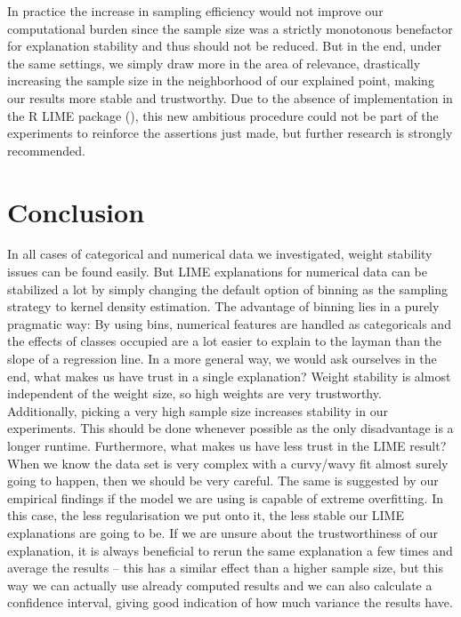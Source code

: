 \documentclass[]{krantz}
\begin{document}
In practice the increase in sampling efficiency would not improve our
computational burden since the sample size was a strictly monotonous
benefactor for explanation stability and thus should not be reduced. But
in the end, under the same settings, we simply draw more in the area of
relevance, drastically increasing the sample size in the neighborhood of
our explained point, making our results more stable and trustworthy. Due
to the absence of implementation in the R LIME package
(\citet{thomasp85lime}), this new ambitious procedure could not be part
of the experiments to reinforce the assertions just made, but further
research is strongly recommended.

\section{Conclusion}\label{conclusion-2}

In all cases of categorical and numerical data we investigated, weight
stability issues can be found easily. But LIME explanations for
numerical data can be stabilized a lot by simply changing the default
option of binning as the sampling strategy to kernel density estimation.
The advantage of binning lies in a purely pragmatic way: By using bins,
numerical features are handled as categoricals and the effects of
classes occupied are a lot easier to explain to the layman than the
slope of a regression line. In a more general way, we would ask
ourselves in the end, what makes us have trust in a single explanation?
Weight stability is almost independent of the weight size, so high
weights are very trustworthy. Additionally, picking a very high sample
size increases stability in our experiments. This should be done
whenever possible as the only disadvantage is a longer runtime.
Furthermore, what makes us have less trust in the LIME result? When we
know the data set is very complex with a curvy/wavy fit almost surely
going to happen, then we should be very careful. The same is suggested
by our empirical findings if the model we are using is capable of
extreme overfitting. In this case, the less regularisation we put onto
it, the less stable our LIME explanations are going to be. If we are
unsure about the trustworthiness of our explanation, it is always
beneficial to rerun the same explanation a few times and average the
results -- this has a similar effect than a higher sample size, but this
way we can actually use already computed results and we can also
calculate a confidence interval, giving good indication of how much
variance the results have.
\end{document}
